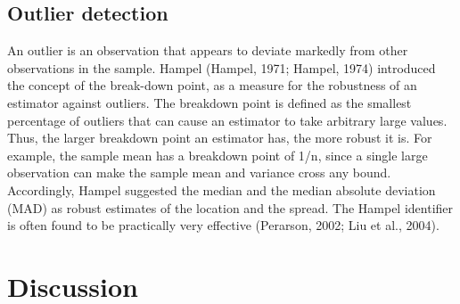 {%


\subsection*{Outlier detection}


An outlier is an observation that appears to deviate markedly from other observations in the sample. Hampel (Hampel, 1971; Hampel, 1974) introduced the concept of the break-down point, as a measure for the robustness of an estimator against outliers.
%
The breakdown point is defined as the smallest percentage of outliers that can cause an estimator to take arbitrary large values. Thus, the larger breakdown point an estimator has, the more robust it is. For example, the sample mean has a breakdown point of 1/n, since a single large observation can make the sample mean and variance cross any bound. 
%
Accordingly, Hampel suggested the median and the median absolute deviation (MAD) as robust estimates of the
location and the spread. The Hampel identifier is often found to be practically very effective (Perarson, 2002; Liu et al., 2004). 




\section*{Discussion}

}
